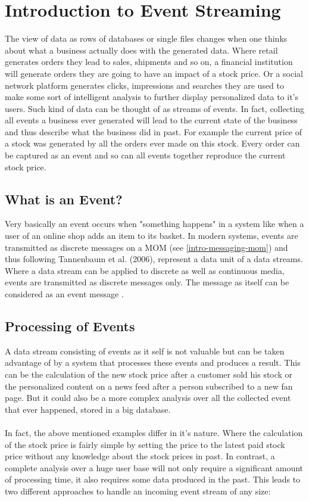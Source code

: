 \chapter{Introduction to Event Streaming}

The view of data as rows of databases or single files changes when one thinks
about what a business actually does with the generated data. Where retail
generates orders they lead to sales, shipments and so on, a financial institution will
generate orders they are going to have an impact of a stock price. Or a social
network platform generates clicks, impressions and searches they are used to
make some sort of intelligent analysis to further display personalized data to
it's users. Such kind of data can be thought of as streams of
events. In fact, collecting all events a business ever generated will lead to the current state
of the business and thus describe what the business did in past. For example the
current price of a stock was generated by all the orders ever made on this
stock. Every order can be captured as an event and so can all events together reproduce
the current stock price.

\section{What is an Event?}
\label{intro-datastream-datastream}
Very basically an event occurs when "something happens"  in a system
like when a user of an online shop adds an item to its basket. In modern systems, events are transmitted as discrete messages on a MOM (see \ref{intro-messaging-mom}) and thus
following Tannenbaum et al. (2006), represent a data unit of a data streams. 
Where a data stream can be applied to discrete as well as continuous media, events are
transmitted as discrete messages only. The message as itself can
be considered as an event message \cite{EIP03}.

\section{Processing of Events}
A data stream consisting of events as it self is not valuable but
can be taken advantage of by a system that processes these events and produces a
result. This can be the calculation of the new stock price after a customer sold
his stock or the personalized content on a news feed after a person subscribed to a new fan
page. But it could also be a more complex analysis over all the collected
event that ever happened, stored in a big database. 
\\ \\
In fact, the above mentioned examples differ in it's nature. Where the
calculation of the stock price is fairly simple by setting the price to the
latest paid stock price without any knowledge about the stock prices in past. 
In contrast, a complete analysis over a huge user base will not only require a
significant amount of processing time, it also requires some data produced in the
past. This leads to two different approaches to handle an incoming event stream
of any size: 

